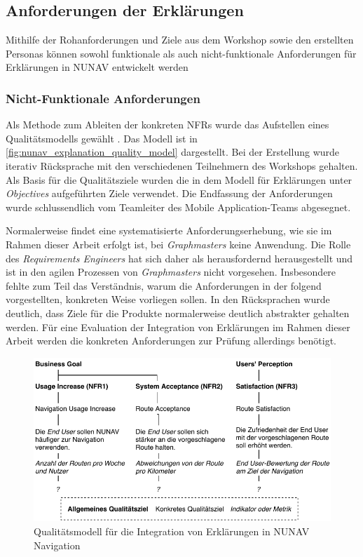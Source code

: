 \subsection{Anforderungen der Erklärungen}
\label{sec:explanation_requirements}

Mithilfe der Rohanforderungen und Ziele aus dem Workshop sowie den erstellten Personas können sowohl funktionale als auch nicht-funktionale Anforderungen für Erklärungen in NUNAV entwickelt werden

\subsubsection{Nicht-Funktionale Anforderungen}

Als Methode zum Ableiten der konkreten NFRs wurde das Aufstellen eines Qualitätsmodells gewählt \cite{schneider2012abenteuer}. Das Modell ist in \autoref{fig:nunav_explanation_quality_model} dargestellt. Bei der Erstellung wurde iterativ Rücksprache mit den verschiedenen Teilnehmern des Workshops gehalten. Als Basis für die Qualitätsziele wurden die in dem Modell für Erklärungen unter \textit{Objectives} aufgeführten Ziele verwendet. Die Endfassung der Anforderungen wurde schlussendlich vom Teamleiter des \glqq Mobile Application\grqq{}-Teams abgesegnet.

Normalerweise findet eine systematisierte Anforderungserhebung, wie sie im Rahmen dieser Arbeit erfolgt ist, bei \textit{Graphmasters} keine Anwendung. Die Rolle des \textit{Requirements Engineers} hat sich daher als herausfordernd herausgestellt und ist in den agilen Prozessen von \textit{Graphmasters} nicht vorgesehen. Insbesondere fehlte zum Teil das Verständnis, warum die Anforderungen in der folgend vorgestellten, konkreten Weise vorliegen sollen. In den Rücksprachen wurde deutlich, dass Ziele für die Produkte normalerweise deutlich abstrakter gehalten werden. Für eine Evaluation der Integration von Erklärungen im Rahmen dieser Arbeit werden die konkreten Anforderungen zur Prüfung allerdings benötigt.

\begin{figure}[b!]
    \centering
    \includegraphics[width=\textwidth]{contents/06_model_evaluation/01_integration/res/quality_model.pdf}
    \caption{Qualitätsmodell für die Integration von Erklärungen in NUNAV Navigation}
    \label{fig:nunav_explanation_quality_model}
\end{figure}

